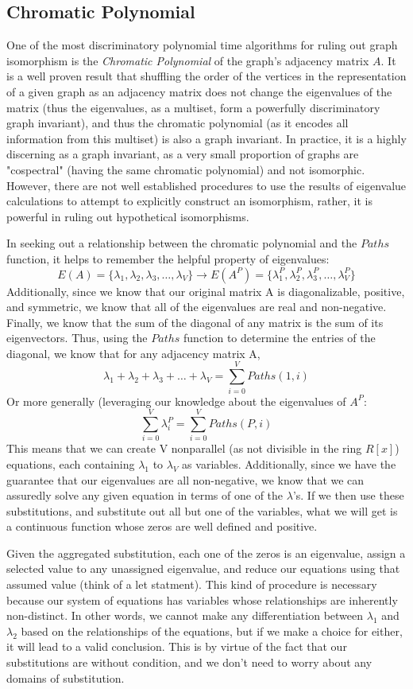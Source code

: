 \documentclass[11pt,a4paper]{report}
\begin{document}
\subsection{Chromatic Polynomial}
One of the most discriminatory polynomial time algorithms for ruling out graph isomorphism is the \emph{Chromatic Polynomial} of the graph's adjacency matrix $A$.
It is a well proven result that shuffling the order of the vertices in the representation of a given graph as an adjacency matrix does not change the eigenvalues of the matrix (thus the eigenvalues, as a multiset, form a powerfully discriminatory graph invariant), and thus the chromatic polynomial (as it encodes all information from this multiset) is also a graph invariant.
In practice, it is a highly discerning as a graph invariant, as a very small proportion of graphs are "cospectral" (having the same chromatic polynomial) and not isomorphic.
However, there are not well established procedures to use the results of eigenvalue calculations to attempt to explicitly construct an isomorphism, rather, it is powerful in ruling out hypothetical isomorphisms. 

In seeking out a relationship between the chromatic polynomial and the $Paths$ function, it helps to remember the helpful property of  eigenvalues:
$$E(A) = \{\lambda_1,\lambda_2,\lambda_3, \dots, \lambda_V\} \rightarrow E(A^P) = \{\lambda_1^P,\lambda_2^P,\lambda_3^P, \dots, \lambda_V^P\} $$
Additionally, since we know that our original matrix A is diagonalizable, positive, and symmetric, we know that all of the eigenvalues are real and non-negative. 
Finally, we know that the sum of the diagonal of any matrix is the sum of its eigenvectors. 
Thus, using the $Paths$ function to determine the entries of the diagonal, we know that for any adjacency matrix A,
$$\lambda_1 + \lambda_2 + \lambda_3 + \dots + \lambda_V = \sum_{i = 0}^{V}{Paths(1, i)}$$
Or more generally (leveraging our knowledge about the eigenvalues of $A^P$:
$$ \sum_{i = 0}^V{\lambda_i^P} =  \sum_{i = 0}^{V}{Paths(P, i)}$$
This means that we can create V nonparallel (as not divisible in the ring $R[x]$) equations, each containing $\lambda_1$ to $\lambda_V$ as variables.
Additionally, since we have the guarantee that our eigenvalues are all non-negative, we know that we can assuredly solve any given equation in terms of one of the $\lambda$'s.
If we then use these substitutions, and substitute out all but one of the variables, what we will get is a continuous function whose zeros are well defined and positive. 

Given the aggregated substitution, each one of the zeros is an eigenvalue, assign a selected value to any unassigned eigenvalue, and reduce our equations using that assumed value (think of a let statment).
This kind of procedure is necessary because our system of equations has variables whose relationships are inherently non-distinct.
In other words, we cannot make any differentiation between $\lambda_1$ and $\lambda_2$ based on the relationships of the equations, but if we make a choice for either, it will lead to a valid conclusion.
This is by virtue of the fact that our substitutions are without condition, and we don't need to worry about any domains of substitution.
\end{document}
